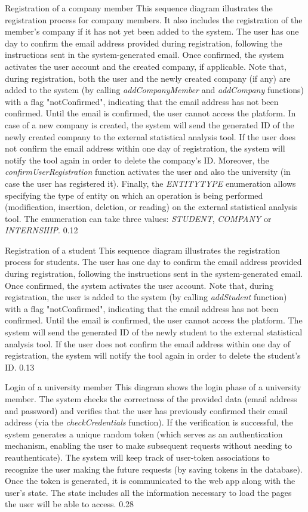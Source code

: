 \runtimeview
{Registration of a company member}
{
    This sequence diagram illustrates the registration process for company members. It also includes the registration of the member's company if it has not yet been added to the system. The user has one day to confirm the email address provided during registration, following the instructions sent in the system-generated email. Once confirmed, the system activates the user account and the created company, if applicable. Note that, during registration, both the user and the newly created company (if any) are added to the system (by calling \textit{addCompanyMember} and \textit{addCompany} functions) with a flag "notConfirmed", indicating that the email address has not been confirmed. Until the email is confirmed, the user cannot access the platform. In case of a new company is created, the system will send the generated ID of the newly created company to the external statistical analysis tool. If the user does not confirm the email address within one day of registration, the system will notify the tool again in order to delete the company's ID. Moreover, the \textit{confirmUserRegistration} function activates the user and also the university (in case the user has registered it). Finally, the \textit{ENTITYTYPE} enumeration allows specifying the type of entity on which an operation is being performed (modification, insertion, deletion, or reading) on the external statistical analysis tool. The enumeration can take three values: \textit{STUDENT}, \textit{COMPANY} or \textit{INTERNSHIP}.
}
{0.12}

\runtimeview
{Registration of a student}
{
    This sequence diagram illustrates the registration process for students. The user has one day to confirm the email address provided during registration, following the instructions sent in the system-generated email. Once confirmed, the system activates the user account. Note that, during registration, the user is added to the system (by calling \textit{addStudent} function) with a flag "notConfirmed", indicating that the email address has not been confirmed. Until the email is confirmed, the user cannot access the platform. The system will send the generated ID of the newly student to the external statistical analysis tool. If the user does not confirm the email address within one day of registration, the system will notify the tool again in order to delete the student's ID.
}
{0.13}

\runtimeview
{Login of a university member}
{
    This diagram shows the login phase of a university member. The system checks the correctness of the provided data (email address and password) and verifies that the user has previously confirmed their email address (via the \textit{checkCredentials} function). If the verification is successful, the system generates a unique random token (which serves as an authentication mechanism, enabling the user to make subsequent requests without needing to reauthenticate). The system will keep track of user-token associations to recognize the user making the future requests (by saving tokens in the database). Once the token is generated, it is communicated to the web app along with the user's state. The state includes all the information necessary to load the pages the user will be able to access.
}
{0.28}

